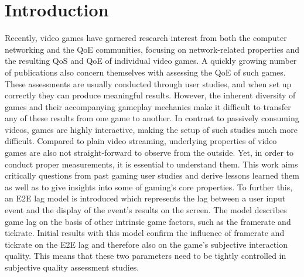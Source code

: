 \section{Introduction}
\label{sec:introduction}

Recently, video games have garnered research interest from both the computer networking and the \gls{QoE} communities, focusing on network-related properties and the resulting \acrshort{QoS} and \gls{QoE} of individual video games. 
A quickly growing number of publications also concern themselves with assessing the \gls{QoE} of such games. These assessments are usually conducted through user studies, and when set up correctly they can produce meaningful results. However, the inherent diversity of games and their accompanying gameplay mechanics make it difficult to transfer any of these results from one game to another. In contrast to passively consuming videos, games are highly interactive, making the setup of such studies much more difficult. Compared to plain video streaming, underlying properties of video games are also not straight-forward to observe from the outside. Yet, in order to conduct proper measurements, it is essential to understand them. This work aims critically questions from past gaming user studies and derive lessons learned them as well as to give insights into some of gaming's core properties. To further this, an \gls{E2E} lag model is introduced which represents the lag between a user input event and the display of the event's results on the screen. The model describes game lag on the basis of other intrinsic game factors, such as the framerate and tickrate. Initial results with this model confirm the influence of framerate and tickrate on the \gls{E2E} lag and therefore also on the game's subjective interaction quality. This means that these two parameters need to be tightly controlled in subjective quality assessment studies.
